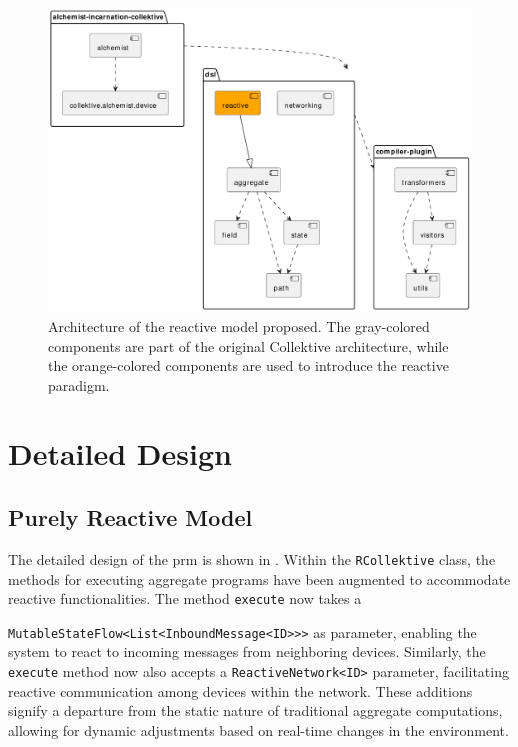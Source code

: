 \begin{figure}
    \centering
    \includegraphics[width=\linewidth]{figures/collektive-prm-architecture.pdf}
    \caption{Architecture of the reactive model proposed. The gray-colored components are part of the original Collektive architecture, while the orange-colored components are used to introduce the reactive paradigm.}
    \label{fig:collektive-prm-architecture}
\end{figure}

\section{Detailed Design}
\label{section:detailed-design}

\subsection{Purely Reactive Model}
\label{subsection:purely-reactive-model}

The detailed design of the \ac{prm} is shown in . Within the \texttt{RCollektive} class, the methods for executing aggregate programs have been augmented to accommodate reactive functionalities. The method \texttt{execute} now takes a

\texttt{MutableStateFlow<List<InboundMessage<ID>>>} as parameter, enabling the system to react to incoming messages from neighboring devices. Similarly, the \texttt{execute} method now also accepts a \texttt{ReactiveNetwork<ID>} parameter, facilitating reactive communication among devices within the network. These additions signify a departure from the static nature of traditional aggregate computations, allowing for dynamic adjustments based on real-time changes in the environment.


